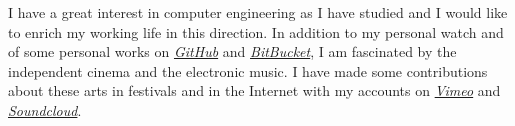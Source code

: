 I have a great interest in computer engineering as I have studied and I would like to enrich my working life in this direction. In addition to my personal watch and of some personal works on \href{https://github.com/vlnk}{\textit{GitHub}} and \href{https://bitbucket.org/vlnk}{\textit{BitBucket}}, I am fascinated by the independent cinema and the electronic music. I have made some contributions about these arts in festivals and in the Internet with my accounts on \href{https://vimeo.com/user3599832}{\textit{Vimeo}} and \href{https://soundcloud.com/vlnk}{\textit{Soundcloud}}.
\vspace{.25em}
